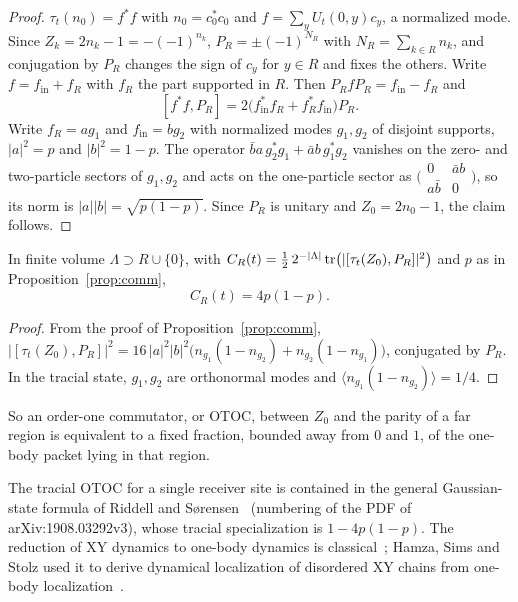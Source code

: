 \begin{proof}
$\tau_t(n_0)=f^*f$ with $n_0=c_0^*c_0$ and $f=\sum_yU_t(0,y)c_y$, a normalized mode. Since $Z_k=2n_k-1=-(-1)^{n_k}$, $P_R=\pm(-1)^{N_R}$ with $N_R=\sum_{k\in R}n_k$, and conjugation by $P_R$ changes the sign of $c_y$ for $y\in R$ and fixes the others. Write $f=f_{\mathrm{in}}+f_R$ with $f_R$ the part supported in $R$. Then $P_RfP_R=f_{\mathrm{in}}-f_R$ and
\[
[f^*f,P_R]=2\bigl(f_{\mathrm{in}}^*f_R+f_R^*f_{\mathrm{in}}\bigr)P_R .
\]
Write $f_R=ag_1$ and $f_{\mathrm{in}}=bg_2$ with normalized modes $g_1,g_2$ of disjoint supports, $|a|^2=p$ and $|b|^2=1-p$. The operator $\bar ba\,g_2^*g_1+\bar ab\,g_1^*g_2$ vanishes on the zero- and two-particle sectors of $g_1,g_2$ and acts on the one-particle sector as $\bigl(\begin{smallmatrix}0&\bar ab\\a\bar b&0\end{smallmatrix}\bigr)$, so its norm is $|a||b|=\sqrt{p(1-p)}$. Since $P_R$ is unitary and $Z_0=2n_0-1$, the claim follows.
\end{proof}

\begin{proposition}\label{prop:otoc}
In finite volume $\Lambda\supset R\cup\{0\}$, with $C_R(t)=\frac12\,2^{-|\Lambda|}\operatorname{tr}\bigl(|[\tau_t(Z_0),P_R]|^2\bigr)$ and $p$ as in Proposition~\ref{prop:comm},
\[
C_R(t)=4p(1-p).
\]
\end{proposition}

\begin{proof}
From the proof of Proposition~\ref{prop:comm}, $|[\tau_t(Z_0),P_R]|^2=16\,|a|^2|b|^2\bigl(n_{g_1}(1-n_{g_2})+n_{g_2}(1-n_{g_1})\bigr)$, conjugated by $P_R$. In the tracial state, $g_1,g_2$ are orthonormal modes and $\langle n_{g_1}(1-n_{g_2})\rangle=1/4$.
\end{proof}

So an order-one commutator, or OTOC, between $Z_0$ and the parity of a far region is equivalent to a fixed fraction, bounded away from $0$ and $1$, of the one-body packet lying in that region.

\begin{remark}\label{rem:otoc}
The tracial OTOC for a single receiver site is contained in the general Gaussian-state formula of Riddell and S{\o}rensen~\cite[Appendix~C, eq.~(C33)]{RiddellSorensen2020} (numbering of the PDF of arXiv:1908.03292v3), whose tracial specialization is $1-4p(1-p)$. The reduction of XY dynamics to one-body dynamics is classical~\cite{LSM1961}; Hamza, Sims and Stolz used it to derive dynamical localization of disordered XY chains from one-body localization~\cite{HSS2012}.
\end{remark}

